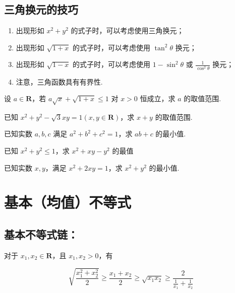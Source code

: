 \documentclass[a4paper , final]{ctexart}
\newenvironment{problem}[1]{%
  \item #1
  \par
  \vspace{8cm}
}{}
\begin{document}
\subsection*{三角换元的技巧}
\begin{enumerate}
  \item 出现形如 $x^2+y^2$ 的式子时，可以考虑使用三角换元；
  \item 出现形如 $\sqrt{1+x}$ 的式子时，可以考虑使用 $\tan^2\theta$ 换元；
  \item 出现形如 $\sqrt{1-x}$ 的式子时，可以考虑使用 $1-\sin^2\theta$ 或 $\frac{1}{\cos^2\theta}$ 换元；
  \item  注意，三角函数具有有界性.
\end{enumerate}

\begin{problems}
  \begin{problem}
    {
      设 $a\in\mathbf{R}$，若 $a\sqrt{x}+\sqrt{1+x}\leq 1$ 对 $x>0$ 恒成立，求 $a$ 的取值范围.
    }
  \end{problem}

  \begin{problem}
    {
      已知 $x^2+y^2-\sqrt{3}xy = 1(x,y\in\mathbf{R})$，求 $x+y$ 的取值范围.
    }
  \end{problem}
\newpage
  \begin{problem}
    {
      已知实数 $a,b,c$ 满足 $a^2+b^2+c^2=1$，求 $ab+c$ 的最小值.
    }
  \end{problem}

  \begin{problem}
    {
      已知 $x^2+y^2\leq 1$，求 $x^2+xy-y^2$ 的最值
    }
  \end{problem}

  \begin{problem}
    {
      已知实数 $x,y$，满足 $x^2+2xy=1$，求 $x^2+y^2$ 的最小值.
    }
  \end{problem}
\end{problems}

\section*{基本（均值）不等式}

\subsection*{基本不等式链：}

对于 $x_1,x_2\in\mathbf{R}$，且 $x_1,x_2>0$，有

$$
\sqrt{\frac{x_1^2+x_2^2}{2}}\geq \frac{x_1+x_2}{2} \geq \sqrt{x_1x_2} \geq\frac{2}{\frac{1}{x_1}+\frac{1}{x_2}} 
$$
\end{document}
